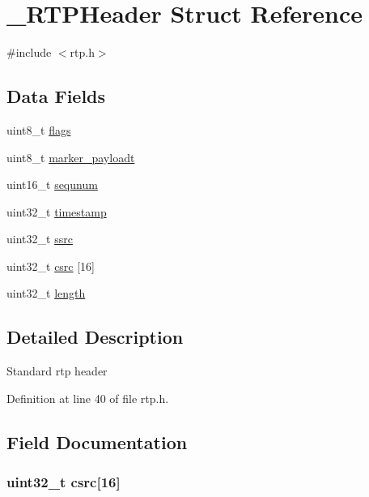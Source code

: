 \hypertarget{struct___r_t_p_header}{\section{\+\_\+\+R\+T\+P\+Header Struct Reference}
\label{struct___r_t_p_header}
}


{\ttfamily \#include $<$rtp.\+h$>$}

\subsection*{Data Fields}
\begin{DoxyCompactItemize}
\item 
uint8\+\_\+t \hyperlink{struct___r_t_p_header_aa2585d779da0ab21273a8d92de9a0ebe}{flags}
\item 
uint8\+\_\+t \hyperlink{struct___r_t_p_header_a18075763f8af96670c357b0322a71d96}{marker\+\_\+payloadt}
\item 
uint16\+\_\+t \hyperlink{struct___r_t_p_header_afe208c7dec97b8f61e08094e61bf096e}{sequnum}
\item 
uint32\+\_\+t \hyperlink{struct___r_t_p_header_ab20b0c7772544cf5d318507f34231fbe}{timestamp}
\item 
uint32\+\_\+t \hyperlink{struct___r_t_p_header_a7728cdfcf33cc14c0d7ba2dcdcbcdf2e}{ssrc}
\item 
uint32\+\_\+t \hyperlink{struct___r_t_p_header_a67d30a003e4e6edc3e5a6304d3a3a301}{csrc} \mbox{[}16\mbox{]}
\item 
uint32\+\_\+t \hyperlink{struct___r_t_p_header_aebb70c2aab3407a9f05334c47131a43b}{length}
\end{DoxyCompactItemize}


\subsection{Detailed Description}
Standard rtp header 

Definition at line 40 of file rtp.\+h.



\subsection{Field Documentation}
\hypertarget{struct___r_t_p_header_a67d30a003e4e6edc3e5a6304d3a3a301}{
\subsubsection[{csrc}]{\setlength{\rightskip}{0pt plus 5cm}uint32\+\_\+t csrc\mbox{[}16\mbox{]}}}\label{struct___r_t_p_header_a67d30a003e4e6edc3e5a6304d3a3a301}


